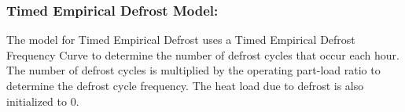 \subsubsection*{Timed Empirical Defrost Model:}\label{eir-air-to-water-heat-pumps-timed-empirical-defrost}
%
The model for Timed Empirical Defrost uses a Timed Empirical Defrost Frequency Curve to determine the number of defrost cycles that occur each hour. The number of defrost cycles is multiplied by the operating part-load ratio to determine the defrost cycle frequency. The heat load due to defrost is also initialized to 0.

